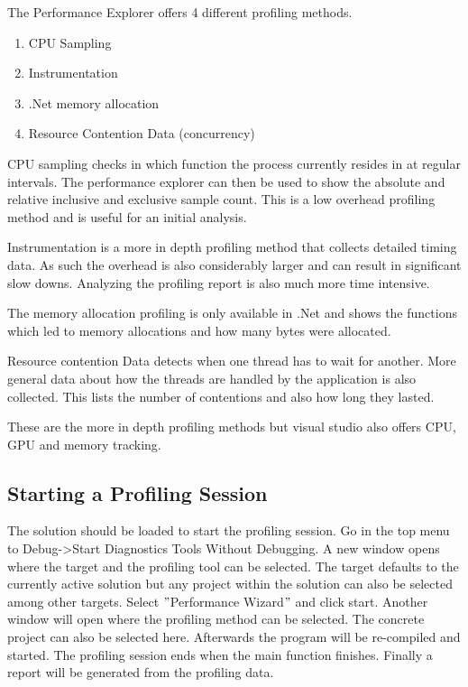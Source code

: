 The Performance Explorer offers 4 different profiling methods. 

\begin{enumerate}
    \item CPU Sampling 
    \item Instrumentation
    \item .Net memory allocation
    \item Resource Contention Data (concurrency)
\end{enumerate}

CPU sampling checks in which function the process currently resides in at regular intervals. The performance explorer can then be used to show the absolute and relative inclusive and exclusive sample count. This is a low overhead profiling method and is useful for an initial analysis.

Instrumentation is a more in depth profiling method that collects detailed timing data. As such the overhead is also considerably larger and can result in significant slow downs. Analyzing the profiling report is also much more time intensive.

The memory allocation profiling is only available in .Net and shows the functions which led to memory allocations and how many bytes were allocated.

Resource contention Data detects when one thread has to wait for another. More general data about how the threads are handled by the application is also collected. This lists the number of contentions and also how long they lasted.

These are the more in depth profiling methods but visual studio also offers CPU, GPU and memory tracking.

\citep{microsoft_how_2015} \citep{microsoft_understanding_2015}

\subsection{Starting a Profiling Session}

The solution should be loaded to start the profiling session. Go in the top menu to Debug->Start Diagnostics Tools Without Debugging.
A new window opens where the target and the profiling tool can be selected. The target defaults to the currently active solution but any project within the solution can also be selected among other targets.
Select $"$Performance Wizard$"$ and click start.
Another window will open where the profiling method can be selected. The concrete project can also be selected here.
Afterwards the program will be re-compiled and started. The profiling session ends when the main function finishes.
Finally a report will be generated from the profiling data.

